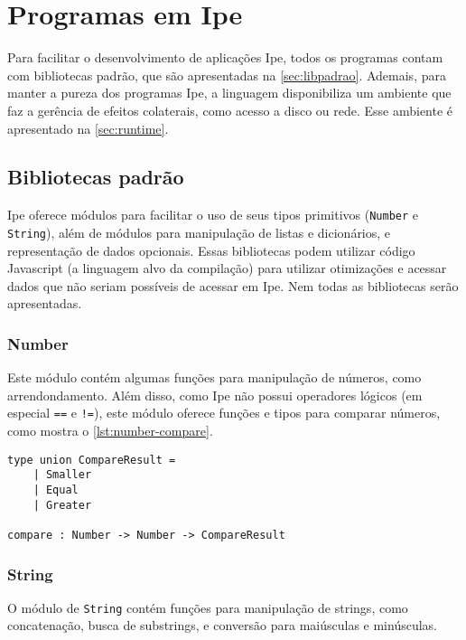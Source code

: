 
\chapter{Programas em Ipe}

Para facilitar o desenvolvimento de aplicações Ipe, todos os programas contam com
bibliotecas padrão, que são apresentadas na \autoref{sec:libpadrao}. Ademais, para
manter a pureza dos programas Ipe, a linguagem disponibiliza um ambiente que
faz a gerência de efeitos colaterais, como acesso a disco ou rede. Esse ambiente
é apresentado na \autoref{sec:runtime}.

\section{Bibliotecas padrão}\label{sec:libpadrao}

Ipe oferece módulos para facilitar o uso de seus tipos primitivos (\texttt{Number}
e \texttt{String}), além de módulos para manipulação de listas e dicionários, e
representação de dados opcionais. Essas bibliotecas podem utilizar código Javascript
(a linguagem alvo da compilação) para utilizar otimizações e acessar dados que
não seriam possíveis de acessar em Ipe. Nem todas as bibliotecas serão apresentadas.

\subsection{Number}

Este módulo contém algumas funções para manipulação de números, como arrendondamento.
Além disso, como Ipe não possui operadores lógicos (em especial \texttt{==} e \texttt{!=}),
este módulo oferece funções e tipos para comparar números, como mostra o \autoref{lst:number-compare}.

\begin{lstlisting}[label={lst:number-compare},caption={Comparação de números em Ipe}]
type union CompareResult =
    | Smaller
    | Equal
    | Greater

compare : Number -> Number -> CompareResult
\end{lstlisting}

\subsection{String}

O módulo de \texttt{String} contém funções para manipulação de strings, como
concatenação, busca de substrings, e conversão para maiúsculas e minúsculas.

